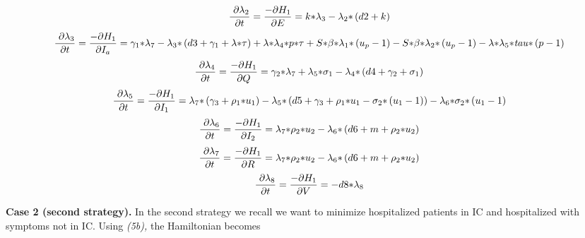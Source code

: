 \documentclass[a4paper]{article}
\begin{document}
\begin{equation*}
\frac{\text ~{\partial}\lambda _2}{{\partial}t}=\frac{-{\partial}H_1}{{\partial}E}=k{\ast}\lambda _3-\lambda
_2{\ast}\left(d2+k\right)
\end{equation*}
\begin{equation*}
\frac{\text ~{\partial}\lambda _3}{{\partial}t}=\frac{-{\partial}H_1}{{\partial}I_a}=\gamma _1{\ast}\lambda _7-\lambda
_3{\ast}\left(d3+\gamma _1+\lambda {\ast}\tau \right)+\lambda {\ast}\lambda _4{\ast}p{\ast}\tau +S{\ast}\beta
{\ast}\lambda _1{\ast}\left(u_p-1\right)-S{\ast}\beta {\ast}\lambda _2{\ast}\left(u_p-1\right)-\lambda {\ast}\lambda
_5{\ast}\mathit{tau}{\ast}\left(p-1\right)
\end{equation*}
\begin{equation*}
\frac{\text ~{\partial}\lambda _4}{{\partial}t}=\frac{-{\partial}H_1}{{\partial}Q}=\gamma _2{\ast}\lambda _7+\lambda
_5{\ast}\sigma _1-\lambda _4{\ast}\left(d4+\gamma _2+\sigma _1\right)
\end{equation*}
\begin{equation*}
\frac{\text ~{\partial}\lambda _5}{{\partial}t}=\frac{-{\partial}H_1}{{\partial}I_1}=\lambda _7{\ast}\left(\gamma
_3+\rho _1{\ast}u_1\right)-\lambda _5{\ast}\left(d5+\gamma _3+\rho _1{\ast}u_1-\sigma
_2{\ast}\left(u_1-1\right)\right)-\lambda _6{\ast}\sigma _2{\ast}\left(u_1-1\right)
\end{equation*}
\begin{equation*}
\frac{\text ~{\partial}\lambda _6}{{\partial}t}=\frac{-{\partial}H_1}{{\partial}I_2}=\lambda _7{\ast}\rho
_2{\ast}u_2-\lambda _6{\ast}\left(d6+m+\rho _2{\ast}u_2\right)
\end{equation*}
\begin{equation*}
\frac{\text ~{\partial}\lambda _7}{{\partial}t}=\frac{-{\partial}H_1}{{\partial}R}=\lambda _7{\ast}\rho
_2{\ast}u_2-\lambda _6{\ast}\left(d6+m+\rho _2{\ast}u_2\right)
\end{equation*}
\begin{equation*}
\frac{\text ~{\partial}\lambda _8}{{\partial}t}=\frac{-{\partial}H_1}{{\partial}V}=-d8{\ast}\lambda _8
\end{equation*}

\bigskip


\bigskip

\textbf{Case 2 (second strategy). }In the second strategy we recall we want to minimize hospitalized patients in IC and
hospitalized with symptoms not in IC. Using \textit{(5b), }the Hamiltonian becomes
\end{document}
